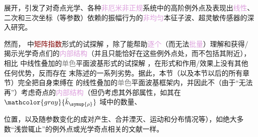 展开\cite{xieAnalytic3DVector}，引发了对\textcolor{NavyBlue}{奇点光学}\cite{berryOpticalSingularitiesBirefringent2003,berryOpticalSingularitiesBianisotropic2005,kirillovUnfoldingEigenvalueSurfaces2005}、各种\textcolor{Plum}{非厄米}\cite{yangNonabelianPhysicsLight2024}\textcolor{Plum}{非正规}\cite{wiersigDistanceExceptionalPoints2022}系统中的高阶\textcolor{PineGreen}{例外点}\cite{mackayExceptionalGuidedWaves2021,wiersigMovingExceptionalSurface2023}及表现出\textcolor{Plum}{线性}、二次和三次坐标（等参数）依赖的\textcolor{PineGreen}{振幅}行为的\textcolor{Plum}{非均匀}\textcolor{PineGreen}{本征子波}\cite{lakhtakiaElectromagneticSurfaceWaves2020,gerardinConditionsVoigtWave2001,borzdovWavesLinearQuadratic1996,sturmElectromagneticWavesCrystals2024}、超灵敏传感器\cite{wiersigReviewExceptionalPointbased2020,wiersigMovingExceptionalSurface2023}的深入研究。

然而， 中\textcolor{Maroon}{矩阵指数}形式的试探解 ，除了能帮助\textcolor{Plum}{逐个}（而无法\textcolor{Plum}{批量}）理解和获得/揭示\textcolor{PineGreen}{光学奇点}们的\textcolor{Plum}{内部结构}（并且只能恰好在这些\textcolor{PineGreen}{例外点}处，而不包括其附近），相比  中\textcolor{PineGreen}{线性叠加的\textcolor{gray}{单色}平面波基}形式的试探解 ，在形式和作用/效果上没有其他任何优势，反而存在  末陈述的一系列劣势。据此，本节（以及本节以后的所有章节）完全把自身束缚在  的\textcolor{PineGreen}{线性叠加的\textcolor{gray}{单色}平面波基}框架内，并因此不（由于“无法再”）考虑奇点的\textcolor{Plum}{内部结构}（但仍考虑其外部属性，如其在 $\mathcolor{gray}{\bar{k}_{\symup{\rho}}}$ 域中的数量、

\clearpage

\noindent 位置，以及随参数变化的成对产生、合并湮灭、运动和分布情况等），如绝大多数“浅尝辄止”的\textcolor{PineGreen}{例外点}\cite{hernandezExceptionalPointsNonHermitian2011,hanExceptionalEntanglementPhenomena2023,baiObservationNonlinearExceptional2024,baiNonlinearExceptionalPoints2023}或\textcolor{PineGreen}{光学奇点}\cite{richterExceptionalPointsAnisotropic2017,grundmannSingularOpticalAxes2016,berryOpticalSingularitiesBirefringent2003,berryOpticalSingularitiesBianisotropic2005,grundmannOpticallyAnisotropicMedia2017}相关的文献一样。

